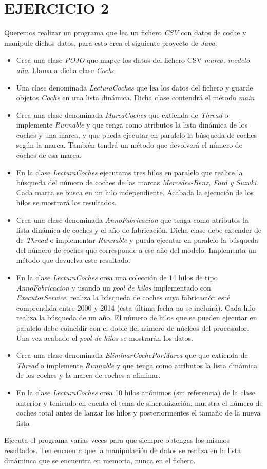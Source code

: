 \documentclass[addpoints]{exam}
\begin{document}
\section{EJERCICIO 2}
Queremos realizar un programa que lea un fichero \emph{CSV} con datos de coche y manipule dichos datos, para esto crea el siguiente proyecto de \emph{Java}:
\begin{itemize}
\item Crea una clase \emph{POJO} que mapee los datos del fichero CSV \emph{marca, modelo  año}. Llama a dicha clase \emph{Coche}
\item Una clase denominada \emph{LecturaCoches} que lea los datos del fichero y guarde objetos \emph{Coche} en una lista dinámica. Dicha clase contendrá el método \emph{main}
\item Crea una clase denominada \emph{MarcaCoches} que extienda de \emph{Thread} o implemente \emph{Runnable} y que tenga como atributos la lista dinámica de los coches y una marca, y que pueda ejecutar en paralelo la búsqueda de coches según la marca. También tendrá un método que devolverá el número de coches de esa marca.
\item En la clase \emph{LecturaCoches} ejecutaras tres hilos en paralelo que realice la búsqueda del número de coches de las marcas \emph{Mercedes-Benz, Ford y Suzuki}. Cada marca se busca en un hilo independiente. Acabada la ejecución de los hilos se mostrará los resultados.
\item Crea una clase denominada \emph{AnnoFabricacion} que tenga como atributos la lista dinámica de coches y el año de fabricación. Dicha clase debe extender de de \emph{Thread} o implementar \emph{Runnable} y pueda ejecutar en paralelo la búsqueda del  número de coches que corresponde a ese año del modelo. Implementa un método que devuelva este resultado.
\item En la clase \emph{LecturaCoches} crea una colección de 14 hilos de tipo \emph{AnnoFabricacion} y usando un \emph{pool de hilos} implementado con \emph{ExecutorService}, realiza la búsqueda de coches cuya fabricación esté comprendida entre 2000 y 2014 (ésta última fecha no se incluirá). Cada hilo realiza la búsqueda de un año. El número de hilos que se pueden ejecutar en paralelo debe coincidir con el doble del número de núcleos del procesador. Una vez acabado el \emph{pool de hilos} se mostrarán los datos.
\item Crea una clase denominada \emph{EliminarCochePorMarca} que que extienda de \emph{Thread} o implemente \emph{Runnable} y que tenga como atributos la lista dinámica de los coches y la marca de coches a eliminar.
\item En la clase \emph{LecturaCoches} crea 10 hilos anónimos (sin referencia) de la clase anterior y teniendo en cuenta el tema de sincronización, muestra el número de coches total antes de lanzar los hilos y posteriormentes el tamaño de la nueva lista
\end{itemize}
Ejecuta el programa varias veces para que siempre obtengas los mismos resultados. Ten encuenta que la manipulación de datos se realiza en la lista dináminca que se encuentra en memoria, nunca en el fichero.
\end{document}
